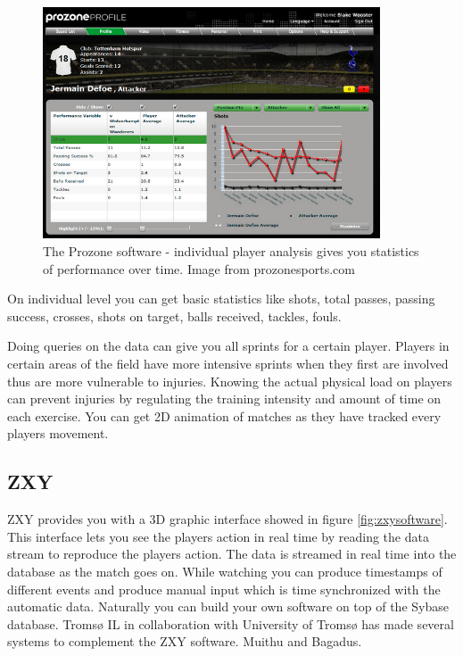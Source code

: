 \begin{figure}[ht!]
\centering
\includegraphics[width=100mm]{images/general/prozonestats.png}
\caption{The Prozone software - individual player analysis gives you statistics of performance over time. Image from prozonesports.com}
\label{overflow}
\end{figure}

On individual level you can get basic statistics like shots, total passes, passing success, crosses, shots on target, balls received, tackles, fouls. 

Doing queries on the data can give you all sprints for a certain player. Players in certain areas of the field have more intensive sprints when they first are involved thus are more vulnerable to injuries. Knowing the actual physical load on players can prevent injuries by regulating the training intensity and amount of time on each exercise. You can get 2D animation of matches as they have tracked every players movement. 

\subsection{ZXY}
  
ZXY provides you with a 3D graphic interface showed in figure \ref{fig:zxysoftware}. This interface lets you see the players action in real time by reading the data stream to reproduce the players action. The data is streamed in real time into the database as the match goes on. While watching you can produce timestamps of different events and produce manual input which is time synchronized with the automatic data. Naturally you can build your own software on top of the Sybase database. Tromsø IL in collaboration with University of Tromsø has made several systems to complement the ZXY software. Muithu and Bagadus.

